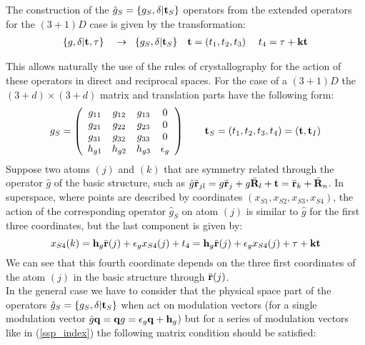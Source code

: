 \documentclass[10pt]{article}
\begin{document}
The construction of the $\hat g_S =\{g_S,\delta|{\bf t}_S \}$ operators from the extended operators for the $(3+1)D$ case is given by the transformation: 
\begin{equation}
\begin{array}{l}
\{{ g},\delta |{\bf{t}},\tau \}\quad  \to \;\;\{g_S,\delta |{\bf t}_S\}\quad {\bf{t}} = ({t_1},{t_2},{t_3})\quad \;{t_4} = \tau  + {\bf {kt}}\\
\end{array}
\end{equation}

This allows naturally the use of the rules of crystallography for the action of these operators in direct and reciprocal spaces. For the case of a $(3+1)D$ the $(3+d)\times(3+d)$ matrix and translation parts have the following form: 
\begin{equation} \label{4d_op}
\begin{array} {l}
g_S = \left( {\begin{array}{*{20}{c}}
	{{g_{11}}}&{{g_{12}}}&{{g_{13}}}&0\\
	{{g_{21}}}&{{g_{22}}}&{{g_{23}}}&0\\
	{{g_{31}}}&{{g_{32}}}&{{g_{33}}}&0\\
	{{h_{g1}}}&{{h_{g2}}}&{{h_{g3}}}&{\epsilon_g}
	\end{array}} \right)\quad
\quad {{\bf t}_S} = ({t_1},{t_2},{t_3},{t_4})=({\bf t},{\bf t}_I)
\end{array}
\end{equation}
Suppose two atoms $(j)$ and $(k)$ that are symmetry related through the operator $\hat g$ of the basic structure, such as $ \hat g \bar {\bf r}_{jl}= g \bar {\bf r}_j + g \bar {\bf R}_l+{\bf t} = \bar{\bf r}_{k} + \bar {\bf R}_{n}$. In superspace, where points are described by coordinates $(x_{S1},x_{S2},x_{S3},x_{S4})$, the action of the corresponding operator $\hat g_S$ on atom $(j)$ is similar to $\hat g$ for the first three coordinates, but the last component is given by:
\begin{equation} \label{x4_transf}
x_{S4}(k)={\bf h}_g \bar {\bf r} (j)+ {\epsilon_g} x_{S4}(j)+t_4={\bf h}_g \bar {\bf r} (j)+ {\epsilon_g} x_{S4}(j)+\tau + {\bf k} {\bf t} 
\end{equation}
We can see that this fourth coordinate depends on the three first coordinates of the atom $(j)$ in the basic structure through $\bar {\bf r}(j)$.\\
In the general case we have to consider that the physical space part of the operators $\hat g_S =\{g_S,\delta|{\bf t}_S \}$ when act on modulation vectors (for a single modulation vector $ \hat g {\bf q} = {\bf q}g = \epsilon_g {\bf q} + {\bf h}_g $) but for a series of modulation vectors like in (\ref{ssp_index}) the following matrix condition should be satisfied:
\end{document}
